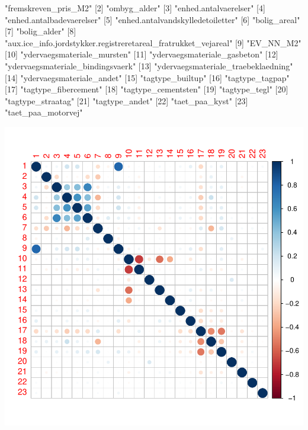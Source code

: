 \documentclass{report}
\begin{document}
\begin{Schunk}
\begin{Soutput}
 [1] "fremskreven_pris_M2"                                          
 [2] "ombyg_alder"                                                  
 [3] "enhed.antalvaerelser"                                         
 [4] "enhed.antalbadevaerelser"                                     
 [5] "enhed.antalvandskylledetoiletter"                             
 [6] "bolig_areal"                                                  
 [7] "bolig_alder"                                                  
 [8] "aux.ice_info.jordstykker.registreretareal_fratrukket_vejareal"
 [9] "EV_NN_M2"                                                     
[10] "ydervaegsmateriale_mursten"                                   
[11] "ydervaegsmateriale_gasbeton"                                  
[12] "ydervaegsmateriale_bindingsvaerk"                             
[13] "ydervaegsmateriale_traebeklaedning"                           
[14] "ydervaegsmateriale_andet"                                     
[15] "tagtype_builtup"                                              
[16] "tagtype_tagpap"                                               
[17] "tagtype_fibercement"                                          
[18] "tagtype_cementsten"                                           
[19] "tagtype_tegl"                                                 
[20] "tagtype_straatag"                                             
[21] "tagtype_andet"                                                
[22] "taet_paa_kyst"                                                
[23] "taet_paa_motorvej"                                            
\end{Soutput}
\end{Schunk}
\includegraphics{rapport_latex-007}
\end{document}

